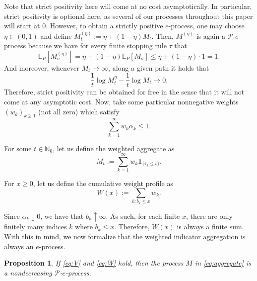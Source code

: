 \documentclass{article}
\newcommand{\ind}[1]{\mathbf{1}_{\{#1\}}}
\newcommand{\EE}{\mathbb E}
\newtheorem{proposition}[theorem]{Proposition}
\theoremstyle{definition}
\begin{document}
Note that strict positivity here will come at no cost asymptotically. In particular, strict positivity is optional here, as several of our processes throughout this paper will start at $0$. However, to obtain a strictly positive $e$-process, one may choose $\eta\in(0,1)$ and define $M_t^{(\eta)}:=\eta + (1-\eta)M_t$. Then, $M^{(\eta)}$ is again a $\mathcal P$-$e$-process because we have for every finite stopping rule $\tau$ that
\[
\EE_P[M_\sigma^{(\eta)}]=\eta+(1-\eta)\EE_P[M_\sigma]\le \eta + (1-\eta) \cdot 1 = 1.
\]
And moreover, whenever $M_t\to\infty$, along a given path it holds that
\[
\frac{1}{t}\log M_t^{\eta}-\frac{1}{t}\log M_t \longrightarrow 0.
\]
Therefore, strict positivity can be obtained for free in the sense that it will not come at any asymptotic cost. Now, take some particular nonnegative weights $(w_k)_{k\ge 1}$ (not all zero) which satisfy
\begin{equation}\label{eq:W}
\sum_{k=1}^{\infty}w_k\alpha_k\le 1.    
\end{equation}

For some $t\in\mathbb N_0$, let us define the weighted aggregate as
\begin{equation}\label{eq:aggregate}
M_t:=\sum_{k=1}^\infty w_k \ind{\tau_k\le t}.
\end{equation}

For $x\ge 0$, let us define the cumulative weight profile as
\begin{equation}\label{eq:Wprofile}
W(x):=\sum_{k:b_k\le x}w_k.    
\end{equation}

Since $\alpha_k\downarrow 0$, we have that $b_k\uparrow \infty$. As such, for each finite $x$, there are only finitely many indices $k$ where $b_k\le x$. Therefore, $W(x)$ is always a finite sum. With this in mind, we now formalize that the weighted indicator aggregation is always an $e$-process.

\begin{proposition}\label{prop:eprocess-validity}
If \eqref{eq:V} and \eqref{eq:W} hold, then the process $M$ in \eqref{eq:aggregate} is a nondecreasing $\mathcal P$-$e$-process.
\end{proposition}
\end{document}
